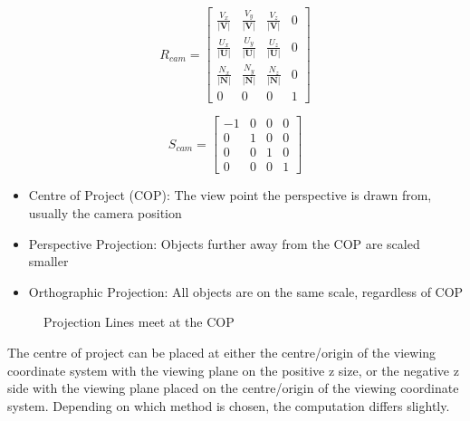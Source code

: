 \begin{equation}
\label{eqn:rotateCam}
R_{cam} =\begin{bmatrix}
\frac{V_x}{\left | \mathbf{V} \right |} & \frac{V_y}{\left | \mathbf{V} \right |} & \frac{V_z}{\left | \mathbf{V} \right |} & 0\\ 
\frac{U_x}{\left | \mathbf{U} \right |} & \frac{U_y}{\left | \mathbf{U} \right |} & \frac{U_z}{\left | \mathbf{U} \right |} & 0\\ 
\frac{N_x}{\left | \mathbf{N} \right |} & \frac{N_y}{\left | \mathbf{N} \right |} & \frac{N_z}{\left | \mathbf{N} \right |} & 0\\ 
0 & 0 & 0 & 1 
\end{bmatrix}
\end{equation}

\begin{equation}
\label{eqn:scaleCam}
S_{cam} = \begin{bmatrix}
-1 & 0 & 0 & 0\\ 
0 & 1 & 0 & 0\\ 
0 & 0 & 1 & 0\\
0 & 0 & 0 & 1 
\end{bmatrix}
\end{equation}


\begin{itemize}
	\item Centre of Project (COP): The view point the perspective is drawn from, usually the camera position
	\item Perspective Projection: Objects further away from the COP are scaled smaller
	\item Orthographic Projection: All objects are on the same scale, regardless of COP
\end{itemize}
\begin{figure}[!htb]
\caption{\label{fig:cop} Projection Lines meet at the COP}
\end{figure}
The centre of project can be placed at either the centre/origin of the viewing coordinate system with the viewing plane on the positive z size, or the negative z side with the viewing plane placed on the centre/origin of the viewing coordinate system. Depending on which method is chosen, the computation differs slightly.

